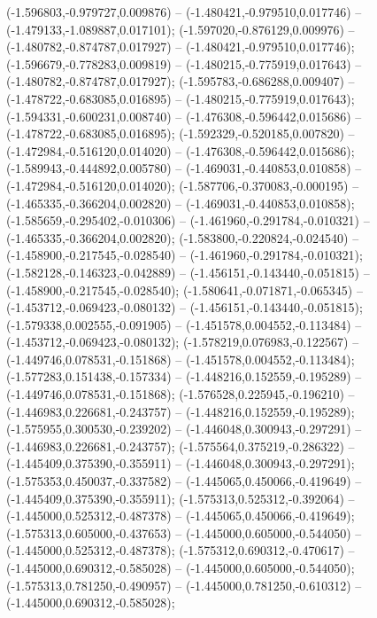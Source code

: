  (-1.596803,-0.979727,0.009876) -- (-1.480421,-0.979510,0.017746) -- (-1.479133,-1.089887,0.017101);
 (-1.597020,-0.876129,0.009976) -- (-1.480782,-0.874787,0.017927) -- (-1.480421,-0.979510,0.017746);
 (-1.596679,-0.778283,0.009819) -- (-1.480215,-0.775919,0.017643) -- (-1.480782,-0.874787,0.017927);
 (-1.595783,-0.686288,0.009407) -- (-1.478722,-0.683085,0.016895) -- (-1.480215,-0.775919,0.017643);
 (-1.594331,-0.600231,0.008740) -- (-1.476308,-0.596442,0.015686) -- (-1.478722,-0.683085,0.016895);
 (-1.592329,-0.520185,0.007820) -- (-1.472984,-0.516120,0.014020) -- (-1.476308,-0.596442,0.015686);
 (-1.589943,-0.444892,0.005780) -- (-1.469031,-0.440853,0.010858) -- (-1.472984,-0.516120,0.014020);
 (-1.587706,-0.370083,-0.000195) -- (-1.465335,-0.366204,0.002820) -- (-1.469031,-0.440853,0.010858);
 (-1.585659,-0.295402,-0.010306) -- (-1.461960,-0.291784,-0.010321) -- (-1.465335,-0.366204,0.002820);
 (-1.583800,-0.220824,-0.024540) -- (-1.458900,-0.217545,-0.028540) -- (-1.461960,-0.291784,-0.010321);
 (-1.582128,-0.146323,-0.042889) -- (-1.456151,-0.143440,-0.051815) -- (-1.458900,-0.217545,-0.028540);
 (-1.580641,-0.071871,-0.065345) -- (-1.453712,-0.069423,-0.080132) -- (-1.456151,-0.143440,-0.051815);
 (-1.579338,0.002555,-0.091905) -- (-1.451578,0.004552,-0.113484) -- (-1.453712,-0.069423,-0.080132);
 (-1.578219,0.076983,-0.122567) -- (-1.449746,0.078531,-0.151868) -- (-1.451578,0.004552,-0.113484);
 (-1.577283,0.151438,-0.157334) -- (-1.448216,0.152559,-0.195289) -- (-1.449746,0.078531,-0.151868);
 (-1.576528,0.225945,-0.196210) -- (-1.446983,0.226681,-0.243757) -- (-1.448216,0.152559,-0.195289);
 (-1.575955,0.300530,-0.239202) -- (-1.446048,0.300943,-0.297291) -- (-1.446983,0.226681,-0.243757);
 (-1.575564,0.375219,-0.286322) -- (-1.445409,0.375390,-0.355911) -- (-1.446048,0.300943,-0.297291);
 (-1.575353,0.450037,-0.337582) -- (-1.445065,0.450066,-0.419649) -- (-1.445409,0.375390,-0.355911);
 (-1.575313,0.525312,-0.392064) -- (-1.445000,0.525312,-0.487378) -- (-1.445065,0.450066,-0.419649);
 (-1.575313,0.605000,-0.437653) -- (-1.445000,0.605000,-0.544050) -- (-1.445000,0.525312,-0.487378);
 (-1.575312,0.690312,-0.470617) -- (-1.445000,0.690312,-0.585028) -- (-1.445000,0.605000,-0.544050);
 (-1.575313,0.781250,-0.490957) -- (-1.445000,0.781250,-0.610312) -- (-1.445000,0.690312,-0.585028);
